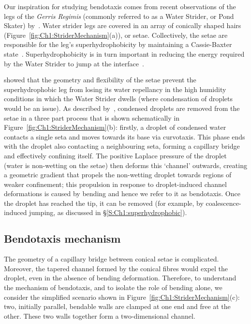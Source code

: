 Our inspiration for studying bendotaxis comes from recent observations of the legs of the \textit{Gerris Regimis} (commonly referred to as a Water Strider, or Pond Skater) by~\cite{Wang2015PNAS}. Water strider legs are covered in an array of conically shaped hairs (Figure~\ref{fig:Ch1:StriderMechanism}(a)), or setae. Collectively, the setae are responsible for the leg's superhydrophobicity by maintaining a Cassie-Baxter state~\citep{Gao2004Nature, Bush2006AnnRevFluidMech}. Superhydrophobicity is in turn important in reducing the energy required by the Water Strider to jump at the interface~\citep{Lee2009JFM}.

\cite{Wang2015PNAS} showed that the geometry and flexibility of the setae prevent the superhydrophobic leg from losing its water repellancy in the high humidity conditions in which the Water Strider dwells (where condensation of droplets would be an issue). As described by~\cite{Wang2015PNAS}, condensed droplets are removed from the setae in a three part process that is shown schematically in Figure~\ref{fig:Ch1:StriderMechanism}(b): firstly, a droplet of condensed water contacts a single seta and moves towards its base via curvotaxis. This phase ends with the droplet also contacting a neighbouring seta, forming a capillary bridge and effectively confining itself. The positive Laplace pressure of the droplet (water is non-wetting on the setae) then deforms this `channel' outwards, creating a geometric gradient that propels the non-wetting droplet towards regions of weaker confinement; this propulsion in response to droplet-induced channel deformations is caused by bending and hence we refer to it as bendotaxis.  Once the droplet has reached the tip, it can be removed (for example, by coalescence-induced jumping, as discussed in \S\ref{S:Ch1:superhydrophobic}).

%


\subsection{Bendotaxis mechanism}
The geometry of a capillary bridge between conical setae is complicated. Moreover, the tapered channel formed by the conical fibres would expel the droplet, even in the absence of bending deformation. Therefore, to understand the mechanism of bendotaxis, and to isolate the role of bending alone, we consider the simplified scenario shown in Figure~\ref{fig:Ch1:StriderMechanism}(c): two, initially parallel, bendable walls are clamped at one end and free at the other. These two walls together form a two-dimensional channel.

